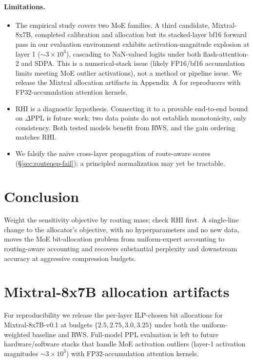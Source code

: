 \documentclass{article}
\newcommand{\method}{\textsc{RWS}\xspace}
\newcommand{\rhi}{\mathrm{RHI}}
\begin{document}
\paragraph{Limitations.}
\begin{itemize}
\item The empirical study covers two MoE families. A third candidate, Mixtral-8x7B, completed calibration and allocation but its stacked-layer bf16 forward pass in our evaluation environment exhibits activation-magnitude explosion at layer 1 ($\sim 3 \times 10^3$), cascading to NaN-valued logits under both flash-attention-2 and SDPA. This is a numerical-stack issue (likely FP16/bf16 accumulation limits meeting MoE outlier activations), not a method or pipeline issue. We release the Mixtral allocation artifacts in Appendix~A for reproducers with FP32-accumulation attention kernels.
\item $\rhi$ is a diagnostic hypothesis. Connecting it to a provable end-to-end bound on $\Delta\text{PPL}$ is future work; two data points do not establish monotonicity, only consistency. Both tested models benefit from \method, and the gain ordering matches $\rhi$.
\item We falsify the naive cross-layer propagation of route-aware scores (\S\ref{sec:routeqep-fail}); a principled normalization may yet be tractable.
\end{itemize}

\section{Conclusion}
Weight the sensitivity objective by routing mass; check $\rhi$ first. A single-line change to the allocator's objective, with no hyperparameters and no new data, moves the MoE bit-allocation problem from uniform-expert accounting to routing-aware accounting and recovers substantial perplexity and downstream accuracy at aggressive compression budgets.




\appendix
\section{Mixtral-8x7B allocation artifacts}
\label{app:mixtral}

For reproducibility we release the per-layer ILP-chosen bit allocations for Mixtral-8x7B-v0.1 at budgets $\{2.5, 2.75, 3.0, 3.25\}$ under both the uniform-weighted baseline and \method. Full-model PPL evaluation is left to future hardware/software stacks that handle MoE activation outliers (layer-1 activation magnitudes $\sim 3{\times}10^3$) with FP32-accumulation attention kernels.
\end{document}
